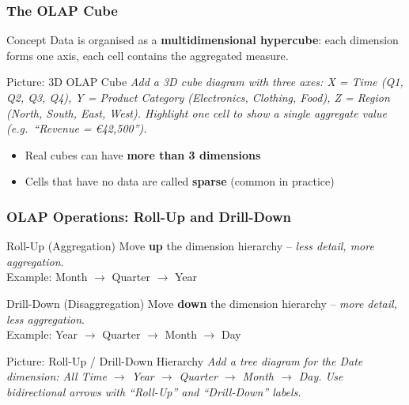 \begin{frame}
  \frametitle{The OLAP Cube}

  \begin{block}{Concept}
    Data is organised as a \textbf{multidimensional hypercube}:
    each dimension forms one axis, each cell contains the aggregated measure.
  \end{block}

  \begin{alertblock}{Picture: 3D OLAP Cube}
    \textit{Add a 3D cube diagram with three axes:
    X = Time (Q1, Q2, Q3, Q4),
    Y = Product Category (Electronics, Clothing, Food),
    Z = Region (North, South, East, West).
    Highlight one cell to show a single aggregate value (e.g.\ ``Revenue = \euro{}42,500'').}
  \end{alertblock}

  \begin{itemize}
    \item Real cubes can have \textbf{more than 3 dimensions}
    \item Cells that have no data are called \textbf{sparse} (common in practice)
  \end{itemize}

\end{frame}

\begin{frame}
  \frametitle{OLAP Operations: Roll-Up and Drill-Down}

  \begin{block}{Roll-Up (Aggregation)}
    Move \textbf{up} the dimension hierarchy -- \textit{less detail, more aggregation}.\\
    Example: Month $\rightarrow$ Quarter $\rightarrow$ Year
  \end{block}

  \begin{block}{Drill-Down (Disaggregation)}
    Move \textbf{down} the dimension hierarchy -- \textit{more detail, less aggregation}.\\
    Example: Year $\rightarrow$ Quarter $\rightarrow$ Month $\rightarrow$ Day
  \end{block}

  \begin{alertblock}{Picture: Roll-Up / Drill-Down Hierarchy}
    \textit{Add a tree diagram for the Date dimension:
    All Time $\rightarrow$ Year $\rightarrow$ Quarter $\rightarrow$ Month $\rightarrow$ Day.
    Use bidirectional arrows with ``Roll-Up'' and ``Drill-Down'' labels.}
  \end{alertblock}

\end{frame}

